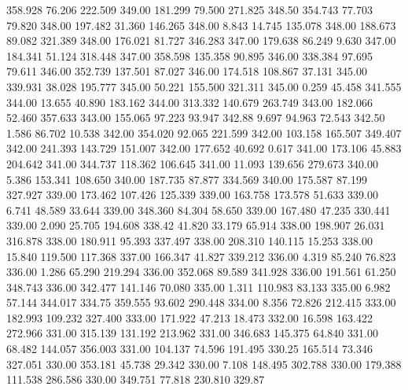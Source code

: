  358.928   76.206  222.509       349.00
 181.299   79.500  271.825       348.50
 354.743   77.703   79.820       348.00
 197.482   31.360  146.265       348.00
   8.843   14.745  135.078       348.00
 188.673   89.082  321.389       348.00
 176.021   81.727  346.283       347.00
 179.638   86.249    9.630       347.00
 184.341   51.124  318.448       347.00
 358.598  135.358   90.895       346.00
 338.384   97.695   79.611       346.00
 352.739  137.501   87.027       346.00
 174.518  108.867   37.131       345.00
 339.931   38.028  195.777       345.00
  50.221  155.500  321.311       345.00
   0.259   45.458  341.555       344.00
  13.655   40.890  183.162       344.00
 313.332  140.679  263.749       343.00
 182.066   52.460  357.633       343.00
 155.065   97.223   93.947       342.88
   9.697   94.963   72.543       342.50
   1.586   86.702   10.538       342.00
 354.020   92.065  221.599       342.00
 103.158  165.507  349.407       342.00
 241.393  143.729  151.007       342.00
 177.652   40.692    0.617       341.00
 173.106   45.883  204.642       341.00
 344.737  118.362  106.645       341.00
  11.093  139.656  279.673       340.00
   5.386  153.341  108.650       340.00
 187.735   87.877  334.569       340.00
 175.587   87.199  327.927       339.00
 173.462  107.426  125.339       339.00
 163.758  173.578   51.633       339.00
   6.741   48.589   33.644       339.00
 348.360   84.304   58.650       339.00
 167.480   47.235  330.441       339.00
   2.090   25.705  194.608       338.42
  41.820   33.179   65.914       338.00
 198.907   26.031  316.878       338.00
 180.911   95.393  337.497       338.00
 208.310  140.115   15.253       338.00
  15.840  119.500  117.368       337.00
 166.347   41.827  339.212       336.00
   4.319   85.240   76.823       336.00
   1.286   65.290  219.294       336.00
 352.068   89.589  341.928       336.00
 191.561   61.250  348.743       336.00
 342.477  141.146   70.080       335.00
   1.311  110.983   83.133       335.00
   6.982   57.144  344.017       334.75
 359.555   93.602  290.448       334.00
   8.356   72.826  212.415       333.00
 182.993  109.232  327.400       333.00
 171.922   47.213   18.473       332.00
  16.598  163.422  272.966       331.00
 315.139  131.192  213.962       331.00
 346.683  145.375   64.840       331.00
  68.482  144.057  356.003       331.00
 104.137   74.596  191.495       330.25
 165.514   73.346  327.051       330.00
 353.181   45.738   29.342       330.00
   7.108  148.495  302.788       330.00
 179.388  111.538  286.586       330.00
 349.751   77.818  230.810       329.87
